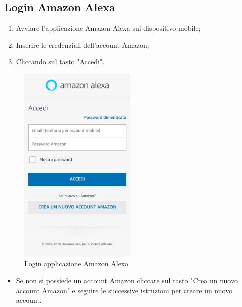 \subsection{Login Amazon Alexa}
\begin{enumerate}
\item Avviare l'applicazione Amazon Alexa sul dispositivo mobile;
\item Inserire le credenziali dell'account Amazon; 
\item Cliccando sul tasto "Accedi".
\end{enumerate}
\begin{figure}[H]
	\centering
	\includegraphics[width=0.5\textwidth]{images/accessoAlexa.png}
	\caption{Login applicazione Amazon Alexa}
\end{figure}

\begin{itemize}
 \item  Se non si possiede un account Amazon cliccare sul tasto "Crea un nuovo account Amazon" e seguire le successive istruzioni per creare un nuovo account.
 \end{itemize}
 

